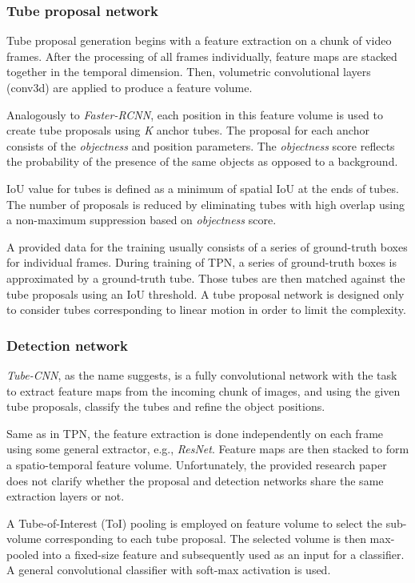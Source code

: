 \subsubsection{Tube proposal network}
Tube proposal generation begins with a feature extraction on a chunk of video frames. After the processing of all frames individually, feature maps are stacked together in the temporal dimension. Then, volumetric convolutional layers (conv3d) are applied to produce a feature volume.

Analogously to \textit{Faster-RCNN}, each position in this feature volume is used to create tube proposals using \textit{K} anchor tubes. The proposal for each anchor consists of the \textit{objectness} and position parameters. The \textit{objectness} score reflects the probability of the presence of the same objects as opposed to a background. 

IoU value for tubes is defined as a minimum of spatial IoU at the ends of tubes. The number of proposals is reduced by eliminating tubes with high overlap using a non-maximum suppression based on \textit{objectness} score. 

A provided data for the training usually consists of a series of ground-truth boxes for individual frames. During training of TPN, a series of ground-truth boxes is approximated by a ground-truth tube. Those tubes are then matched against the tube proposals using an IoU threshold. A tube proposal network is designed only to consider tubes corresponding to linear motion in order to limit the complexity. 

\subsubsection{Detection network}
\textit{Tube-CNN}, as the name suggests, is a fully convolutional network with the task to extract feature maps from the incoming chunk of images, and using the given tube proposals, classify the tubes and refine the object positions. 

Same as in TPN, the feature extraction is done independently on each frame using some general extractor, e.g., \textit{ResNet}. Feature maps are then stacked to form a spatio-temporal feature volume. Unfortunately, the provided research paper does not clarify whether the proposal and detection networks share the same extraction layers or not.

A Tube-of-Interest (ToI) pooling is employed on feature volume to select the sub-volume corresponding to each tube proposal. The selected volume is then max-pooled into a fixed-size feature and subsequently used as an input for a classifier. A general convolutional classifier with soft-max activation is used. 

